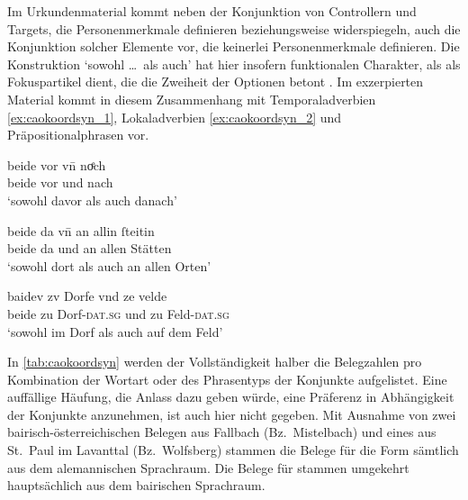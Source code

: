 Im Urkundenmaterial kommt neben der Konjunktion von Controllern und Targets,
die Personenmerkmale definieren beziehungsweise widerspiegeln, auch die
Konjunktion solcher Elemente vor, die keinerlei Personenmerkmale definieren.
Die Konstruktion  `sowohl \dots\ als auch' hat
hier insofern funktionalen Charakter, als  als Fokuspartikel dient,
die die Zweiheit der Optionen betont \autocites(siehe auch
\cref{sec:ovwbeideconj})[425--428]{johannessen2005}.
% 
% 
% 
Im exzerpierten Material kommt  in diesem Zusammenhang mit
Temporaladverbien \cref{ex:caokoordsyn_1}, Lokaladverbien
\cref{ex:caokoordsyn_2} und Präpositionalphrasen
 vor.

\begin{exe}
\ex \label{ex:caokoordsyn}
	\begin{xlist}
	\ex \label{ex:caokoordsyn_1}
		\gll beide vor vn̄ noͤch \\
			beide vor und nach \\
		\trans `sowohl davor als auch danach'
			\parencites(Nr.~N~689, Straßburg, 1295)[499,25]{cao5}

	\ex \label{ex:caokoordsyn_2}
		\gll beide da vn̄ an allin ſteitin \\
			beide da und an allen Stätten \\
		\trans `sowohl dort als auch an allen  Orten'
			\parencites(Nr.~N~321, Rosheim, Dépt.~Bas-Rhin, 1286)[245,24]{cao5}

	\ex \label{ex:caokoordsyn_3}
		\gll baidev zv Dorfe vnd ze velde \\
			beide zu Dorf-\textsc{dat.sg} und zu Feld-\textsc{dat.sg} \\
		\trans `sowohl im Dorf als auch auf dem Feld'
			\parencites(Nr.~3319, Michelstetten, Bz.~Mistelbach, 1299)[461,28]{cao4}
	\end{xlist}
\end{exe}

In \cref{tab:caokoordsyn} werden der Vollständigkeit halber die Belegzahlen pro
Kombination der Wortart oder des Phrasentyps der Konjunkte aufgelistet. Eine
auffällige Häufung, die Anlass dazu geben würde, eine Präferenz in Abhängigkeit
der Konjunkte anzunehmen, ist auch hier nicht gegeben. Mit Ausnahme von zwei
bairisch-österreichischen Belegen aus Fallbach (Bz.~Mistelbach) und eines aus
St.~Paul im Lavanttal (Bz.~Wolfsberg) stammen die Belege für die Form
 sämtlich aus dem alemannischen Sprachraum. Die Belege für
 stammen umgekehrt hauptsächlich aus dem bairischen Sprachraum.

